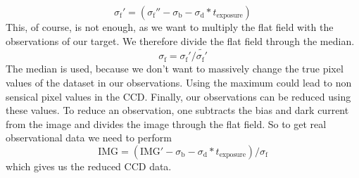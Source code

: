 \documentclass{article}
\begin{document}
\begin{equation}
    \sigma_\text{f}' = (\sigma_\text{f}'' -\sigma_\text{b} -\sigma_\text{d}*t_\text{exposure})
\end{equation}
This, of course, is not enough, as we want to multiply the flat field with the observations of our target. We therefore divide the flat field through the median.
\begin{equation}
    \sigma_\text{f} = \sigma_\text{f}'/\widetilde{\sigma_\text{f}'} 
\end{equation}
The median is used, because we don't want to massively change the true pixel values of the dataset in our observations. Using the maximum could lead to non sensical pixel values in the CCD.\newline
Finally, our observations can be reduced using these values. To reduce an observation, one subtracts the bias and dark current from the image and divides the image through the flat field. So to get real observational data we need to perform
\begin{equation}
    \text{IMG} = (\text{IMG}' -\sigma_\text{b} -\sigma_\text{d}*t_\text{exposure})/\sigma_\text{f}
\end{equation}
which gives us the reduced CCD data.
\end{document}
